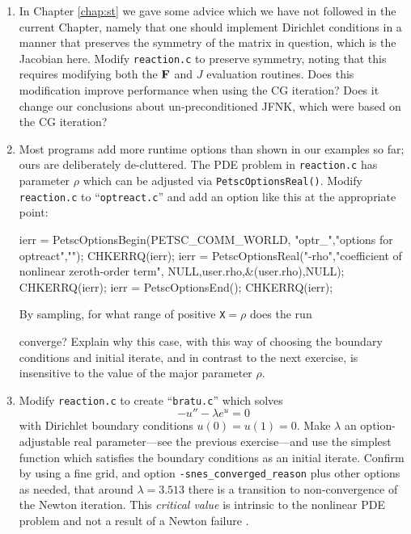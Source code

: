 \begin{enumerate}
\item \label{exer:nl:symmetrizeJ}  In Chapter \ref{chap:st} we gave some advice which we have not followed in the current Chapter, namely that one should implement Dirichlet conditions in a manner that preserves the symmetry of the matrix in question, which is the Jacobian here.  Modify \texttt{reaction.c} to preserve symmetry, noting that this requires modifying both the $\mathbf{F}$ and $J$ evaluation routines.  Does this modification improve performance when using the CG iteration?  Does it change our conclusions about un-preconditioned JFNK, which were based on the CG iteration?

\item Most \PETSc programs add more runtime options than shown in our examples so far; ours are deliberately de-cluttered.  The PDE problem in \texttt{reaction.c} has parameter $\rho$ which can be adjusted via \texttt{PetscOptionsReal()}.  Modify \texttt{reaction.c} to ``\texttt{optreact.c}'' and add an option like this at the appropriate point:
\begin{code}
  ierr = PetscOptionsBegin(PETSC_COMM_WORLD,
                           "optr_","options for optreact",""); CHKERRQ(ierr);
  ierr = PetscOptionsReal("-rho","coefficient of nonlinear zeroth-order term",
                          NULL,user.rho,&(user.rho),NULL); CHKERRQ(ierr);
  ierr = PetscOptionsEnd(); CHKERRQ(ierr);
\end{code}
By sampling, for what range of positive \texttt{X}$=\rho$ does the run
converge?  Explain why this case, with this way of choosing the boundary conditions and initial iterate, and in contrast to the next exercise, is insensitive to the value of the major parameter $\rho$.

\item \label{exer:nl:bratu} Modify \texttt{reaction.c} to create ``\texttt{bratu.c}'' which solves
\begin{equation}
    - u'' - \lambda e^u = 0 \label{eq:nl:bratuoned}
\end{equation}
with Dirichlet boundary conditions $u(0)=u(1)=0$.  Make $\lambda$ an option-adjustable real parameter---see the previous exercise---and use the simplest function which satisfies the boundary conditions as an initial iterate.  Confirm by using a fine grid, and option \texttt{-snes\_converged\_reason} plus other options as needed, that around $$ there is a transition to non-convergence of the Newton iteration.  This \emph{critical value} is intrinsic to the nonlinear PDE problem and not a result of a Newton failure \citep{Doedeletal1991}.


\end{enumerate}
